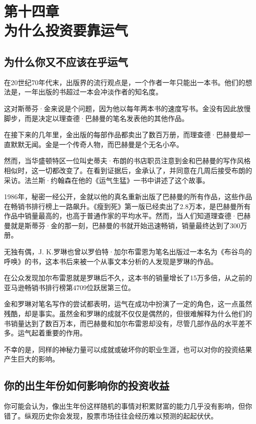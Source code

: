 \section[第十四章\q 为什么投资要靠运气]{第十四章\\ 为什么投资要靠运气}
\renewcommand{\bookchapter}{14}
\setcounter{figure}{0}
\setcounter{table}{0}
\subsection{为什么你又不应该在乎运气}
在20世纪70年代末，出版界的流行观点是，一个作者一年只能出一本书。他们的想法是，一年出版的书超过一本会冲淡作者的知名度。

这对斯蒂芬·金来说是个问题，因为他以每年两本书的速度写书。金没有因此放慢脚步，而是决定以理查德·巴赫曼的笔名发表他的其他作品。

在接下来的几年里，金出版的每部作品都卖出了数百万册，而理查德·巴赫曼却一直默默无闻。金是一个传奇人物，而巴赫曼是个无名小卒。

然而，当华盛顿特区一位叫史蒂夫·布朗的书店职员注意到金和巴赫曼的写作风格相似时，这一切都改变了。在看到证据后，金承认了，并同意在几周后接受布朗的采访。法兰斯·约翰森在他的《运气生猛》一书中讲述了这个故事。

1986年，秘密一经公开，金就以他的真名重新出版了巴赫曼的所有作品，这些作品在畅销书排行榜上一路飙升。《瘦到死》第一版已经卖出了2.8万本，是巴赫曼所有作品中销量最高的，也高于普通作家的平均水平。然而，当人们知道理查德·巴赫曼就是斯蒂芬·金的那一刻，巴赫曼的书就开始迅速畅销，销量最终达到了300万册。

无独有偶，J. K.罗琳也曾以罗伯特·加尔布雷恩为笔名出版过一本名为《布谷鸟的呼唤》的书，这本书后来被一个从事文本分析的人发现是罗琳的作品。

在公众发现加尔布雷恩就是罗琳后不久，这本书的销量增长了15万多倍，从之前的亚马逊畅销书排行榜第4709位跃居第三位。

金和罗琳对笔名写作的尝试都表明，运气在成功中扮演了一定的角色，这一点虽然残酷，却是事实。虽然金和罗琳的成就不仅仅是偶然的，但很难解释为什么他们的书销量达到了数百万本，而巴赫曼和加尔布雷恩却没有，尽管几部作品的水平差不多。运气起着重要的作用。

不幸的是，同样的神秘力量可以成就或破坏你的职业生涯，也可以对你的投资结果产生巨大的影响。

\subsection{你的出生年份如何影响你的投资收益}
你可能会认为，像出生年份这样随机的事情对积累财富的能力几乎没有影响，但你错了。纵观历史你会发现，股票市场往往会经历难以预测的起起伏伏。

